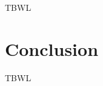 \documentclass[conference,compsoc]{IEEEtran}
\begin{document}
TBWL

\section{Conclusion}
TBWL

\end{document}

